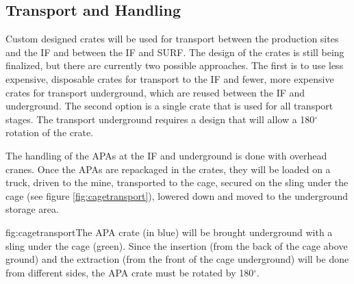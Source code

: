

\subsection{Transport and Handling}
\label{sec:fdsp-apa-install-transport}

Custom designed crates will be used for transport between the production sites and the IF and between the IF and SURF. The design of the crates is still being finalized, but there are currently two possible approaches. The first is to use less expensive, disposable crates for transport to the IF and fewer, more expensive crates for transport underground, which are reused between the IF and underground. The second option is a single crate that is used for all transport stages. The transport underground requires a design that will allow a 180$^{\circ}$ rotation of the crate. 


The handling of the APAs at the IF and underground is done with overhead cranes. Once the APAs are repackaged in the crates, they  will be loaded on a truck, driven to the mine, transported to the cage, secured on the sling under the cage (see figure \ref{fig:cagetransport}), lowered down and moved to the underground storage area.

\begin{dunefigure}{fig:cagetransport}{The APA crate (in blue) will be brought underground with a sling under the cage (green). Since the insertion (from the back of the cage above ground) and the extraction (from the front of the cage underground) will be done from different sides, the APA crate must be rotated by 180$^{\circ}$.}
\setlength{\fboxsep}{0pt}
\setlength{\fboxrule}{0.5pt}
\end{dunefigure}


